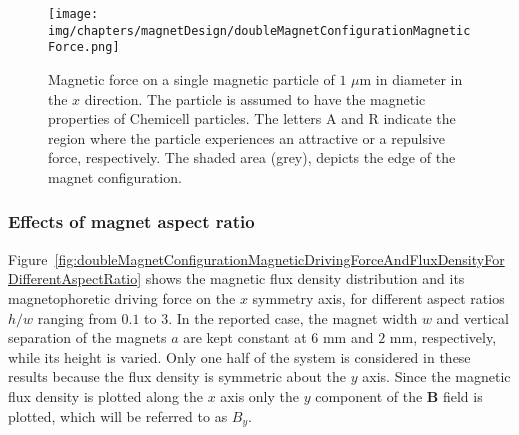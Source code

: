 \begin{figure}[htb]%
\centering
   \texttt{[image: img/chapters/magnetDesign/doubleMagnetConfigurationMagneticForce.png]}
\caption[Magnetic force on a single magnetic particle along the $x$ axis when exposed to the magnetic field of the double magnet configuration]{Magnetic force on a single magnetic particle of $1$ $\mu$m in diameter in the $x$ direction. The particle is assumed to have the magnetic properties of Chemicell particles. The letters A and R indicate the region where the particle experiences an attractive or a repulsive force, respectively. The shaded area (grey), depicts the edge of the magnet configuration.}%
\label{fig:doubleMagnetConfiguraitonMagneticDrivingForce}%
\end{figure}


\subsubsection{Effects of magnet aspect ratio}\label{subsubsec:effectsOfMagnetAspectRatio}
Figure~\ref{fig:doubleMagnetConfigurationMagneticDrivingForceAndFluxDensityForDifferentAspectRatio} shows the  magnetic flux density distribution and its magnetophoretic driving force on the $x$ symmetry axis, for different aspect ratios $h/w$ ranging from $0.1$ to $3$. In the reported case, the magnet width $w$ and vertical separation of the magnets $a$ are kept constant at $6$ mm and $2$ mm, respectively, while its height is varied. Only one half of the system is considered in these results because the flux density is symmetric about the $y$ axis. Since the magnetic flux density is plotted along the $x$ axis only the $y$ component of the $\mathbf{B}$ field is plotted, which will be referred to as $B_{y}$.

